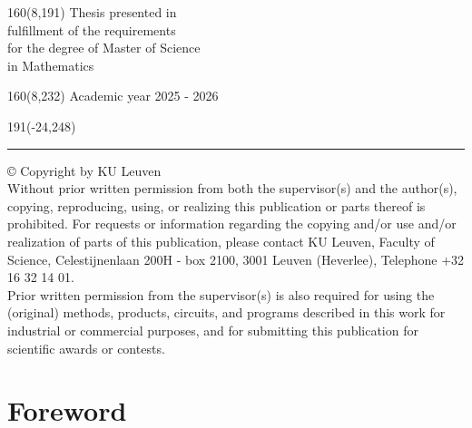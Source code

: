 \documentclass[12pt,a4paper,oneside]{book}
\theoremstyle{definition}
\begin{document}
%
\begin{textblock}{160}(8,191)
\textblockcolour{}
\vspace{-\parskip}
\flushright
Thesis presented in\\[4.5pt]
fulfillment of the requirements\\[4.5pt]
for the degree of Master of Science\\[4.5pt]
in Mathematics\\
\end{textblock}
%
\begin{textblock}{160}(8,232)
\textblockcolour{}
\vspace{-\parskip}
\flushright
Academic year 2025 - 2026
\end{textblock}
%
\begin{textblock}{191}(-24,248)
{\color{blueline}\rule{550pt}{5.5pt}}
\end{textblock}
%
\vfill
\newpage

\sffamily
\setcounter{page}{0}
\vspace*{\fill}
\noindent
© Copyright by KU Leuven\\

\noindent
Without prior written permission from both the supervisor(s) and the author(s), copying, reproducing, using, or realizing this publication or parts thereof is prohibited. For requests or information regarding the copying and/or use and/or realization of parts of this publication, please contact KU Leuven, Faculty of Science, Celestijnenlaan 200H - box 2100, 3001 Leuven (Heverlee), Telephone +32 16 32 14 01.\\

\noindent
Prior written permission from the supervisor(s) is also required for using the (original) methods, products, circuits, and programs described in this work for industrial or commercial purposes, and for submitting this publication for scientific awards or contests.
\newpage
\cleardoublepage
{}
\chapter*{Foreword}
\end{document}
